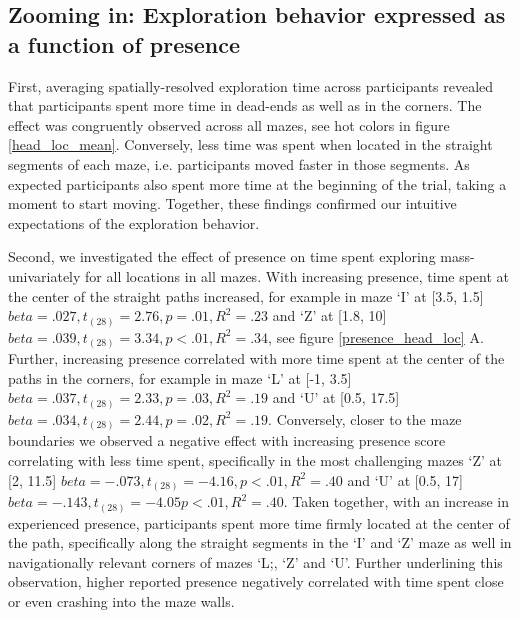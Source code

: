 \subsection{Zooming in: Exploration behavior expressed as a function of presence} 
First, averaging spatially-resolved exploration time across participants revealed that participants spent more time in dead-ends as well as in the corners. The effect was congruently observed across all mazes, see hot colors in figure \ref{head_loc_mean}. Conversely, less time was spent when located in the straight segments of each maze, i.e. participants moved faster in those segments. As expected participants also spent more time at the beginning of the trial, taking a moment to start moving. Together, these findings confirmed our intuitive expectations of the exploration behavior. 

Second, we investigated the effect of presence on time spent exploring mass-univariately for all locations in all mazes. With increasing presence, time spent at the center of the straight paths increased, for example in maze `I' at [3.5, 1.5] $beta=.027, t_{(28)}=2.76, p=.01, R^2=.23$ and `Z' at [1.8, 10] $beta=.039, t_{(28)}=3.34, p<.01, R^2=.34$, see figure \ref{presence_head_loc} A. Further, increasing presence correlated with more time spent at the center of the paths in the corners, for example in maze `L' at [-1, 3.5] $beta=.037, t_{(28)}=2.33, p=.03, R^2=.19$ and `U' at [0.5, 17.5] $beta=.034, t_{(28)}=2.44, p=.02, R^2=.19$. Conversely, closer to the maze boundaries we observed a negative effect with increasing presence score correlating with less time spent, specifically in the most challenging mazes `Z' at [2, 11.5] $beta=-.073, t_{(28)}=-4.16, p<.01, R^2=.40$ and `U' at [0.5, 17] $beta=-.143, t_{(28)}=-4.05 p<.01, R^2=.40$. Taken together, with an increase in experienced presence, participants spent more time firmly located at the center of the path, specifically along the straight segments in the `I' and `Z' maze as well in navigationally relevant corners of mazes `L;, `Z' and `U'. Further underlining this observation, higher reported presence negatively correlated with time spent close or even crashing into the maze walls.

